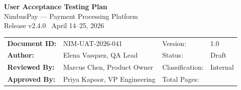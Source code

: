 \documentclass[11pt,a4paper]{article}
\begin{document}
\begin{tcolorbox}[
  enhanced,
  colback=primaryNavy,
  colframe=primaryNavy,
  boxrule=0pt,
  left=16pt,
  right=16pt,
  top=14pt,
  bottom=14pt,
  sharp corners
]
  \begin{center}
    {\color{white}\LARGE\bfseries User Acceptance Testing Plan}\\[6pt]
    {\color{white}\large NimbusPay --- Payment Processing Platform}\\[4pt]
    {\color{white}\normalsize Release v2.4.0 \textbar{} \faCalendar\ April 14--25, 2026}
  \end{center}
\end{tcolorbox}

\vspace{10pt}

\begin{tcolorbox}[
  enhanced,
  colback=bgLight,
  colframe=borderGray,
  boxrule=0.8pt,
  left=12pt,
  right=12pt,
  top=10pt,
  bottom=10pt,
  sharp corners,
  title={\textbf{\faFile\ Document Control}},
  fonttitle=\bfseries\color{primaryNavy}
]
  \begin{tabularx}{\textwidth}{@{}>{\bfseries}l X l l@{}}
    Document ID:   & NIM-UAT-2026-041 & Version:   & 1.0 \\
    Author:        & Elena Vasquez, QA Lead & Status: & Draft \\
    Reviewed By:   & Marcus Chen, Product Owner & Classification: & Internal \\
    Approved By:   & Priya Kapoor, VP Engineering & Total Pages: & \pageref{LastPage} \\
  \end{tabularx}
\end{tcolorbox}

\vspace{12pt}








\end{document}
